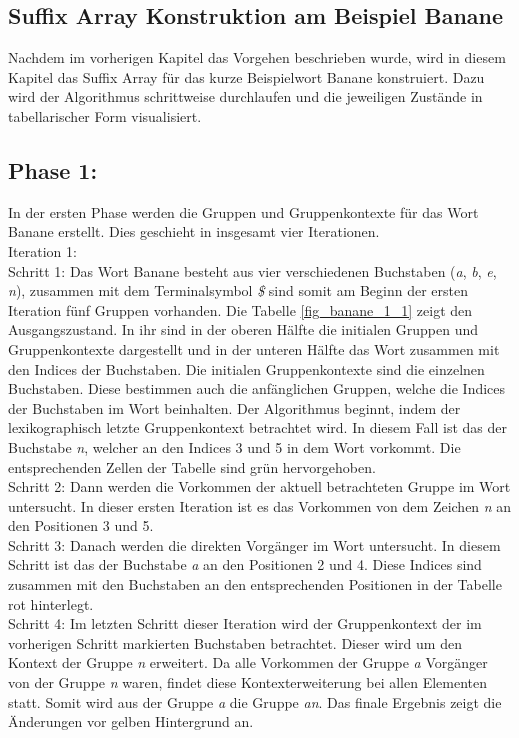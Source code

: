 \subsection{Suffix Array Konstruktion am Beispiel Banane}
\label{gsaca:chapter3}
%
Nachdem im vorherigen Kapitel das Vorgehen beschrieben wurde, wird in diesem Kapitel das Suffix Array für das kurze Beispielwort Banane konstruiert.
Dazu wird der Algorithmus schrittweise durchlaufen und die jeweiligen Zustände in tabellarischer Form visualisiert.

\subsection*{Phase 1:}
In der ersten Phase werden die Gruppen und Gruppenkontexte für das Wort Banane erstellt. 
Dies geschieht in insgesamt vier Iterationen.\\

Iteration 1:\\
Schritt 1: Das Wort Banane besteht aus vier verschiedenen Buchstaben (\textit{a}, \textit{b}, \textit{e}, \textit{n}), zusammen mit dem Terminalsymbol \textit{\$} sind somit am Beginn der ersten Iteration fünf Gruppen vorhanden. 
Die Tabelle \ref{fig_banane_1_1} zeigt den Ausgangszustand.
In ihr sind in der oberen Hälfte die initialen Gruppen und Gruppenkontexte dargestellt und in der unteren Hälfte das Wort zusammen mit den Indices der Buchstaben. 
Die initialen Gruppenkontexte sind die einzelnen Buchstaben.
Diese bestimmen auch die anfänglichen Gruppen, welche die Indices der Buchstaben im Wort beinhalten.
Der Algorithmus beginnt, indem der lexikographisch letzte Gruppenkontext betrachtet wird. 
In diesem Fall ist das der Buchstabe \textit{n}, welcher an den Indices 3 und 5 in dem Wort vorkommt. 
Die entsprechenden Zellen der Tabelle sind grün hervorgehoben. \\
Schritt 2: Dann werden die Vorkommen der aktuell betrachteten Gruppe im Wort untersucht. 
In dieser ersten Iteration ist es das Vorkommen von dem Zei\-chen \textit{n} an den Positionen 3 und 5. \\
Schritt 3: Danach werden die direkten Vorgänger im Wort untersucht. 
In diesem Schritt ist das der Buchstabe \textit{a} an den Positionen 2 und 4. 
Diese Indices sind zusammen mit den Buchstaben an den entsprechenden Positionen in der Tabelle rot hinterlegt. \\
Schritt 4: Im letzten Schritt dieser Iteration wird der Gruppenkontext der im vorherigen Schritt markierten Buchstaben betrachtet.
Dieser wird um den Kontext der Gruppe \textit{n} erweitert. 
Da alle Vorkommen der Gruppe \textit{a} Vorgänger von der Gruppe \textit{n} waren, findet diese Kontexterweiterung bei allen Elementen statt. 
Somit wird aus der Gruppe \textit{a} die Gruppe \textit{an}. Das finale Ergebnis zeigt die Änderungen vor gelben Hintergrund an.\\

